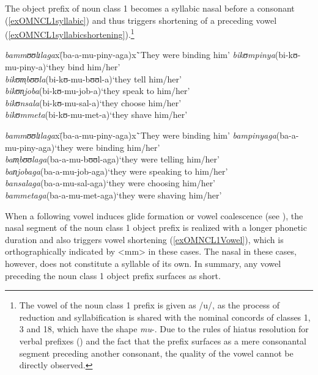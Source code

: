 \label{OMNCL1syllabic} The object prefix of noun class 1 becomes a syllabic nasal before a consonant (\ref{exOMNCL1syllabic}) and thus triggers shortening of a preceding vowel (\ref{exOMNCL1syllabicshortening}).\footnote{The vowel of the noun class 1 prefix is given as /u/, as the process of reduction and syllabification is shared with the nominal concords of classes 1, 3 and 18, which have the shape \textit{mu}-. Due to the rules of hiatus resolution for verbal prefixes () and the fact that the prefix surfaces as a mere consonantal segment preceding another consonant, the quality of the vowel cannot be directly observed.}
\begin{exe}
	\ex \label{exOMNCL1syllabic}
	\begin{tabbing}
		\textit{bammʊʊlɪlaga}x\=(\degree ba-a-mu-piny-aga)x\=`They were binding him'\kill
		\textit{bikʊmpinya}\>(\degree bi-kʊ-mu-piny-a)\>`they bind him/her'\\
		\textit{bikʊm̩bʊʊla}\>(\degree bi-kʊ-mu-bʊʊl-a)\>`they tell him/her'\\
		\textit{bikʊn̩joba}\>(\degree bi-kʊ-mu-job-a)\>`they speak to him/her'\\
		\textit{bikʊnsala}\>(\degree bi-kʊ-mu-sal-a)\>`they choose him/her'\\
		\textit{bikʊmmeta}\>(\degree bi-kʊ-mu-met-a)\>`they shave him/her'
	\end{tabbing}
	\ex \label{exOMNCL1syllabicshortening}
	\begin{tabbing}
		\textit{bammʊʊlɪlaga}x\=(\degree ba-a-mu-piny-aga)x\=`They were binding him'\kill
		\textit{bampinyaga}\>(\degree ba-a-mu-piny-aga)\>`they were binding him/her'\\
		\textit{bam̩bʊʊlaga}\>(\degree ba-a-mu-bʊʊl-aga)\>`they were telling him/her'\\
		\textit{ban̩jobaga}\>(\degree ba-a-mu-job-aga)\>`they were speaking to him/her'\\
		\textit{bansalaga}\>(\degree ba-a-mu-sal-aga)\>`they were choosing him/her'\\
		\textit{bammetaga}\>(\degree ba-a-mu-met-aga)\>`they were shaving him/her'
	\end{tabbing}
\end{exe}

When a following vowel induces glide formation or vowel coalescence (see ), the nasal segment of the noun class 1 object prefix is realized with a longer phonetic duration and also triggers vowel shortening (\ref{exOMNCL1Vowel}), which is orthographically indicated by <mm> in these cases. The nasal in these cases, however, does not constitute a syllable of its own. In summary, any vowel preceding the noun class 1 object prefix surfaces as short.

